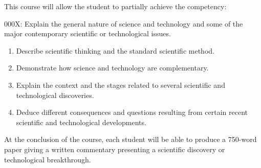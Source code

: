 {This course will allow the student to partially achieve the competency:

000X: Explain the general nature of science and technology and some of the major contemporary scientific or technological issues.
\begin{enumerate}
	\item Describe scientific thinking and the standard scientific method.
	\item Demonstrate how science and technology are complementary.
	\item Explain the context and the stages related to several scientific and technological discoveries.
	\item Deduce different consequences and questions resulting from certain recent scientific and technological developments.
\end{enumerate}

At the conclusion of the course, each student will be able to produce a 750-word paper giving a written
commentary presenting a scientific discovery or technological breakthrough.
}
